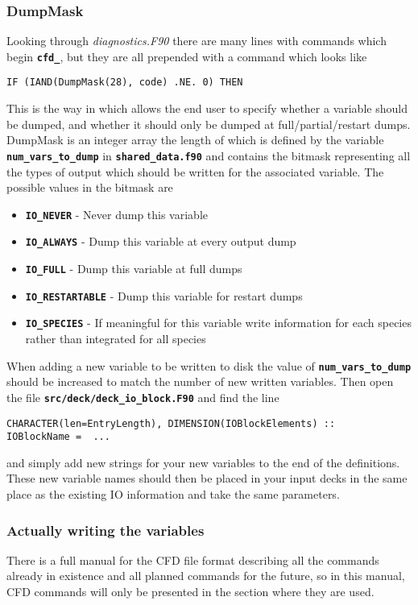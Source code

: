 \documentclass[12pt,a4paper]{article}
\newcommand{\simpleboxverbatim}{\begin{Verbatim}[obeytabs=true,frame=single,
  framerule=0.5mm,rulecolor=\color{warwickmid},formatcom=\color{black}]}
\newcommand{\inlinecode}[1]{{\color{warwickred} \bf\texttt{#1}}}
\newcommand{\EPOCH}{{\color{warwickdark}\fontfamily{phv}\selectfont{EPOCH}}}
\begin{document}
\subsubsection{DumpMask}
Looking through {\it diagnostics.F90} there are many lines with commands which
begin \inlinecode{cfd\_}, but they are all prepended with a command which looks
like
\simpleboxverbatim
     IF (IAND(DumpMask(28), code) .NE. 0) THEN
\end{Verbatim}
This is the way in which {\EPOCH} allows the end user to specify whether a
variable should be dumped, and whether it should only be dumped at
full/partial/restart dumps. DumpMask is an integer array the length of which is
defined by the variable \inlinecode{num\_vars\_to\_dump} in
\inlinecode{shared\_data.f90} and contains the bitmask representing all the
types of output which should be written for the associated variable. The
possible values in the bitmask are

\begin{itemize}
\item \inlinecode{IO\_NEVER} - Never dump this variable
\item \inlinecode{IO\_ALWAYS} - Dump this variable at every output dump
\item \inlinecode{IO\_FULL} - Dump this variable at full dumps
\item \inlinecode{IO\_RESTARTABLE} - Dump this variable for restart dumps
\item \inlinecode{IO\_SPECIES} - If meaningful for this variable write
  information for each species rather than integrated for all species
\end{itemize}

When adding a new variable to be written to disk the value of
\inlinecode{num\_vars\_to\_dump} should be increased to match the number of new
written variables. Then open the file \inlinecode{src/deck/deck\_io\_block.F90}
and find the line
\simpleboxverbatim
  CHARACTER(len=EntryLength), DIMENSION(IOBlockElements) ::   IOBlockName =  ...
\end{Verbatim}

and simply add new strings for your new variables to the end of the
definitions. These new variable names should then be placed in your input decks
in the same place as the existing IO information and take the same parameters.

\subsubsection{Actually writing the variables}
There is a full manual for the CFD file format describing all the commands
already in existence and all planned commands for the future, so in this
manual, CFD commands will only be presented in the section where they are used.
\end{document}
